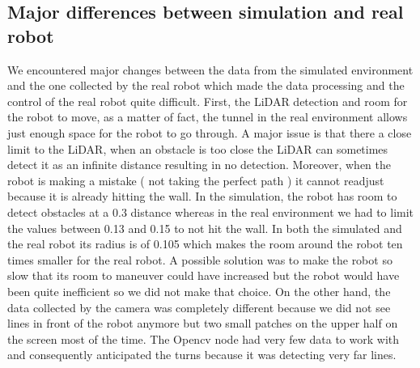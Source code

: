 \documentclass[conference]{IEEEtran}
\begin{document}
\subsection{Major differences between simulation and real robot}
We encountered major changes between the data from the simulated environment and the one collected by the real robot which made the data processing and the control of the real robot quite difficult.
First, the LiDAR detection and room for the robot to move, as a matter of fact, the tunnel in the real environment allows just enough space for the robot to go through. A major issue is that there a close limit to the LiDAR, when an obstacle is too close the LiDAR can sometimes detect it as an infinite distance resulting in no detection. Moreover, when the robot is making a mistake ( not taking the perfect path ) it cannot readjust because it is already hitting the wall. In the simulation, the robot has room to detect obstacles at a 0.3 distance whereas in the real environment we had to limit the values between 0.13 and 0.15 to not hit the wall. In both the simulated and the real robot its radius is of 0.105 which makes the room around the robot ten times smaller for the real robot. A possible solution was to make the robot so slow that its room to maneuver could have increased but the robot would have been quite inefficient so we did not make that choice. On the other hand, the data collected by the camera was completely different because we did not see lines in front of the robot anymore but two small patches on the upper half on the screen most of the time. The Opencv node had very few data to work with and consequently anticipated the turns because it was detecting very far lines.
\end{document}
